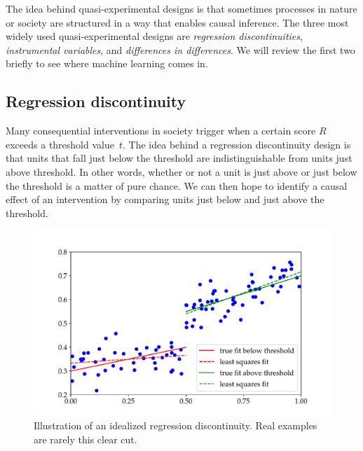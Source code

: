 \documentclass{tufte-book}
\begin{document}
The idea behind quasi-experimental designs is that sometimes processes
in nature or society are structured in a way that enables causal
inference. The three most widely used quasi-experimental designs are
\emph{regression discontinuities}, \emph{instrumental variables}, and
\emph{differences in differences}. We will review the first two briefly
to see where machine learning comes
in.

\hypertarget{regression-discontinuity}{%
\subsection{Regression discontinuity}\label{regression-discontinuity}}

Many consequential interventions in society trigger when a certain score
\(R\) exceeds a threshold value~\(t\). The idea behind a regression
discontinuity design is that units that fall just below the threshold
are indistinguishable from units just above threshold. In other words,
whether or not a unit is just above or just below the threshold is a
matter of pure chance. We can then hope to identify a causal effect of
an intervention by comparing units just below and just above the
threshold.

\begin{figure}
\centering
\includegraphics{assets/rdd}
\caption{Illustration of an idealized regression discontinuity. Real
examples are rarely this clear cut.}
\end{figure}
\end{document}
